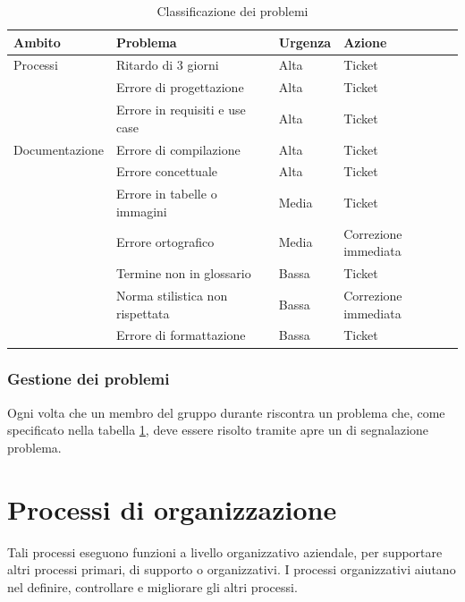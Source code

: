 \documentclass[12pt,a4paper]{article}
\begin{document}
\begin{table}[H]
	\begin{tabular}{p{} p{} p{} p{}}
		\toprule
		\textbf{Ambito}	&	\textbf{Problema}	&	\textbf{Urgenza}	&	\textbf{Azione}\\
		\midrule
		\midrule
		Processi & Ritardo di 3 giorni & Alta & Ticket \\
		\midrule
		& Errore di progettazione & Alta & Ticket \\
		\midrule
		& Errore in requisiti e use case & Alta & Ticket \\
		\midrule
		\midrule
		Documentazione & Errore di compilazione & Alta & Ticket \\
		\midrule
		& Errore concettuale & Alta & Ticket \\
		\midrule
		& Errore in tabelle o immagini & Media & Ticket \\
		\midrule
		& Errore ortografico & Media & Correzione immediata \\
		\midrule
		& Termine non in glossario & Bassa & Ticket \\
		\midrule
		& Norma stilistica non rispettata & Bassa & Correzione immediata \\
		\midrule
		& Errore di formattazione & Bassa & Ticket \\
		\bottomrule
	\end{tabular}
	\caption{Classificazione dei problemi}
	\label{tabCalssificazioneProb}
\end{table}

\subsubsection{Gestione dei problemi}

\label{ticketProblema}
Ogni volta che un membro del gruppo durante riscontra un problema che, come specificato nella tabella \ref{tabCalssificazioneProb}, deve essere risolto tramite  apre un  di segnalazione problema.




\newpage

\section{Processi di organizzazione}
Tali processi eseguono funzioni a livello organizzativo aziendale, per supportare altri processi primari, di supporto o organizzativi.
I processi organizzativi aiutano nel definire, controllare e migliorare gli altri processi.
\end{document}
